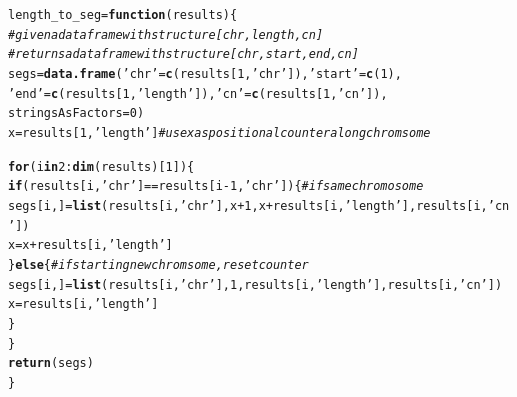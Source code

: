 \documentclass[12pt]{article}\usepackage[]{graphicx}\usepackage[]{color}
\makeatletter
\newcommand{\hlnum}[1]{\textcolor[rgb]{0.686,0.059,0.569}{#1}}%
\newcommand{\hlstr}[1]{\textcolor[rgb]{0.192,0.494,0.8}{#1}}%
\newcommand{\hlcom}[1]{\textcolor[rgb]{0.678,0.584,0.686}{\textit{#1}}}%
\newcommand{\hlopt}[1]{\textcolor[rgb]{0,0,0}{#1}}%
\newcommand{\hlstd}[1]{\textcolor[rgb]{0.345,0.345,0.345}{#1}}%
\newcommand{\hlkwa}[1]{\textcolor[rgb]{0.161,0.373,0.58}{\textbf{#1}}}%
\newcommand{\hlkwb}[1]{\textcolor[rgb]{0.69,0.353,0.396}{#1}}%
\newcommand{\hlkwc}[1]{\textcolor[rgb]{0.333,0.667,0.333}{#1}}%
\newcommand{\hlkwd}[1]{\textcolor[rgb]{0.737,0.353,0.396}{\textbf{#1}}}%
\newenvironment{kframe}{%
 \def\at@end@of@kframe{}%
 \ifinner\ifhmode%
  \def\at@end@of@kframe{\end{minipage}}%
  \begin{minipage}{\columnwidth}%
 \fi\fi%
 \def\FrameCommand##1{\hskip\@totalleftmargin \hskip-\fboxsep
 \colorbox{shadecolor}{##1}\hskip-\fboxsep
     \hskip-\linewidth \hskip-\@totalleftmargin \hskip\columnwidth}%
 \MakeFramed {\advance\hsize-\width
   \@totalleftmargin\z@ \linewidth\hsize
   \@setminipage}}%
 {\par\unskip\endMakeFramed%
 \at@end@of@kframe}
\newenvironment{knitrout}{}{} %
\makeatother
\begin{document}
\begin{knitrout}
\begin{kframe}
\begin{alltt}
\hlstd{length_to_seg} \hlkwb{=} \hlkwa{function}\hlstd{(}\hlkwc{results}\hlstd{)\{}
  \hlcom{#given a dataframe with structure [chr, length, cn]}
  \hlcom{#returns a dataframe with structure [chr, start, end, cn]}
  \hlstd{segs} \hlkwb{=} \hlkwd{data.frame}\hlstd{(}\hlstr{'chr'} \hlstd{=} \hlkwd{c}\hlstd{(results[}\hlnum{1}\hlstd{,}\hlstr{'chr'}\hlstd{]),} \hlstr{'start'} \hlstd{=} \hlkwd{c}\hlstd{(}\hlnum{1}\hlstd{),}
                    \hlstr{'end'} \hlstd{=} \hlkwd{c}\hlstd{(results[}\hlnum{1}\hlstd{,}\hlstr{'length'}\hlstd{]),} \hlstr{'cn'} \hlstd{=} \hlkwd{c}\hlstd{(results[}\hlnum{1}\hlstd{,}\hlstr{'cn'}\hlstd{]),}
                    \hlkwc{stringsAsFactors} \hlstd{=} \hlnum{0}\hlstd{)}
  \hlstd{x} \hlkwb{=} \hlstd{results[}\hlnum{1}\hlstd{,}\hlstr{'length'}\hlstd{]} \hlcom{#use x as positional counter along chromsome}

  \hlkwa{for} \hlstd{(i} \hlkwa{in} \hlnum{2}\hlopt{:}\hlkwd{dim}\hlstd{(results)[}\hlnum{1}\hlstd{])\{}
    \hlkwa{if} \hlstd{(results[i,} \hlstr{'chr'}\hlstd{]} \hlopt{==} \hlstd{results[i}\hlopt{-}\hlnum{1}\hlstd{,} \hlstr{'chr'}\hlstd{])\{} \hlcom{#if same chromosome}
      \hlstd{segs[i,]} \hlkwb{=} \hlkwd{list}\hlstd{(results[i,}\hlstr{'chr'}\hlstd{],x}\hlopt{+}\hlnum{1}\hlstd{,x}\hlopt{+}\hlstd{results[i,}\hlstr{'length'}\hlstd{],results[i,}\hlstr{'cn'}\hlstd{])}
      \hlstd{x} \hlkwb{=} \hlstd{x} \hlopt{+} \hlstd{results[i,} \hlstr{'length'}\hlstd{]}
    \hlstd{\}}\hlkwa{else}\hlstd{\{} \hlcom{#if starting new chromsome, reset counter}
      \hlstd{segs[i,]} \hlkwb{=} \hlkwd{list}\hlstd{(results[i,}\hlstr{'chr'}\hlstd{],} \hlnum{1}\hlstd{, results[i,}\hlstr{'length'}\hlstd{], results[i,}\hlstr{'cn'}\hlstd{])}
      \hlstd{x} \hlkwb{=} \hlstd{results[i,} \hlstr{'length'}\hlstd{]}
    \hlstd{\}}
  \hlstd{\}}
  \hlkwd{return}\hlstd{(segs)}
\hlstd{\}}


\end{alltt}
\end{kframe}
\end{knitrout}
\end{document}

